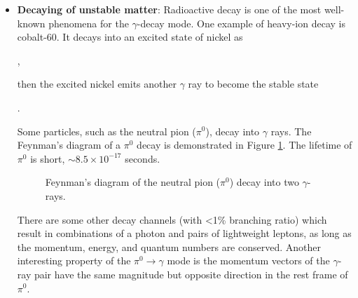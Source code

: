 
\begin{itemize}
    \item \textbf{Decaying of unstable matter}:
    Radioactive decay is one of the most well-known phenomena for the $\gamma$-decay mode. One example of heavy-ion decay is cobalt-60. It decays 
    into an excited state of nickel as

    ,

    then the excited nickel
    emits another $\gamma$ ray to become the stable state

    .

    Some particles, such as the neutral pion ($\pi^0$),
    decay into $\gamma$ rays.
    The Feynman's diagram of a $\pi^0$ decay is demonstrated in
    Figure \ref{fig:neutral_pion_decay}.
    The lifetime of $\pi^0$ is short, $\sim 8.5\times10^{-17}$ seconds.
    \begin{figure}[h!]
        \centering
        
        \caption{Feynman's diagram of the neutral pion ($\pi^0$) decay into two $\gamma$-rays.}
        \label{fig:neutral_pion_decay}
    \end{figure}
    There are some other decay channels (with <1\% branching
    ratio) which result in combinations of a photon and pairs of
    lightweight leptons, as long as the momentum, energy, and
    quantum numbers are conserved.
    Another interesting property of the $\pi^0\rightarrow\gamma$ mode
    is the momentum
    vectors of the $\gamma$-ray pair have the same magnitude but
    opposite direction in the rest frame of $\pi^0$.


\end{itemize}
